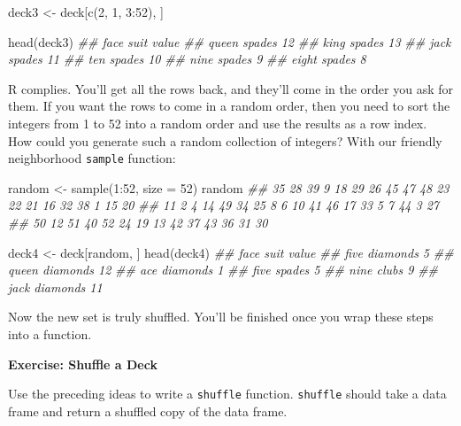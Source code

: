 \documentclass[
  letterpaper,
  DIV=11,
  numbers=noendperiod]{scrbook}
\newenvironment{Shaded}{\begin{snugshade}}{\end{snugshade}}
\newcommand{\AttributeTok}[1]{\textcolor[rgb]{0.40,0.45,0.13}{#1}}
\newcommand{\DecValTok}[1]{\textcolor[rgb]{0.68,0.00,0.00}{#1}}
\newcommand{\DocumentationTok}[1]{\textcolor[rgb]{0.37,0.37,0.37}{\textit{#1}}}
\newcommand{\FunctionTok}[1]{\textcolor[rgb]{0.28,0.35,0.67}{#1}}
\newcommand{\NormalTok}[1]{\textcolor[rgb]{0.00,0.23,0.31}{#1}}
\newcommand{\OtherTok}[1]{\textcolor[rgb]{0.00,0.23,0.31}{#1}}
\newcommand{\SpecialCharTok}[1]{\textcolor[rgb]{0.37,0.37,0.37}{#1}}
\begin{document}
\begin{Shaded}
\begin{Highlighting}[]
\NormalTok{deck3 }\OtherTok{\textless{}{-}}\NormalTok{ deck[}\FunctionTok{c}\NormalTok{(}\DecValTok{2}\NormalTok{, }\DecValTok{1}\NormalTok{, }\DecValTok{3}\SpecialCharTok{:}\DecValTok{52}\NormalTok{), ]}

\FunctionTok{head}\NormalTok{(deck3)}
\DocumentationTok{\#\#   face   suit value}
\DocumentationTok{\#\#  queen spades    12}
\DocumentationTok{\#\#   king spades    13}
\DocumentationTok{\#\#   jack spades    11}
\DocumentationTok{\#\#    ten spades    10}
\DocumentationTok{\#\#   nine spades     9}
\DocumentationTok{\#\#  eight spades     8}
\end{Highlighting}
\end{Shaded}

R complies. You'll get all the rows back, and they'll come in the order
you ask for them. If you want the rows to come in a random order, then
you need to sort the integers from 1 to 52 into a random order and use
the results as a row index. How could you generate such a random
collection of integers? With our friendly neighborhood \texttt{sample}
function:

\begin{Shaded}
\begin{Highlighting}[]
\NormalTok{random }\OtherTok{\textless{}{-}} \FunctionTok{sample}\NormalTok{(}\DecValTok{1}\SpecialCharTok{:}\DecValTok{52}\NormalTok{, }\AttributeTok{size =} \DecValTok{52}\NormalTok{)}
\NormalTok{random}
\DocumentationTok{\#\#  35 28 39  9 18 29 26 45 47 48 23 22 21 16 32 38  1 15 20}
\DocumentationTok{\#\#  11  2  4 14 49 34 25  8  6 10 41 46 17 33  5  7 44  3 27}
\DocumentationTok{\#\#  50 12 51 40 52 24 19 13 42 37 43 36 31 30}

\NormalTok{deck4 }\OtherTok{\textless{}{-}}\NormalTok{ deck[random, ]}
\FunctionTok{head}\NormalTok{(deck4)}
\DocumentationTok{\#\#   face     suit value}
\DocumentationTok{\#\#   five diamonds     5}
\DocumentationTok{\#\#  queen diamonds    12}
\DocumentationTok{\#\#    ace diamonds     1}
\DocumentationTok{\#\#   five   spades     5}
\DocumentationTok{\#\#   nine    clubs     9}
\DocumentationTok{\#\#   jack diamonds    11}
\end{Highlighting}
\end{Shaded}

Now the new set is truly shuffled. You'll be finished once you wrap
these steps into a function.

\begin{tcolorbox}[enhanced jigsaw, left=2mm, breakable, colback=white, colframe=quarto-callout-color-frame, leftrule=.75mm, bottomrule=.15mm, arc=.35mm, opacityback=0, rightrule=.15mm, toprule=.15mm]

\vspace{-3mm}\textbf{Exercise: Shuffle a Deck}\vspace{3mm}

Use the preceding ideas to write a \texttt{shuffle} function.
\texttt{shuffle} should take a data frame and return a shuffled copy of
the data frame.

\end{tcolorbox}
\end{document}
